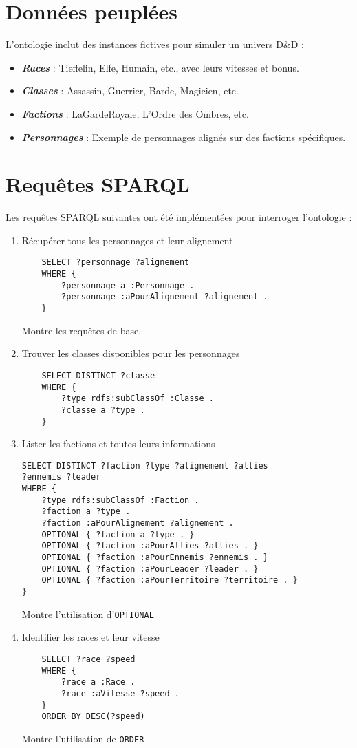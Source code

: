 \documentclass{article}
\newcommand{\cmd}[1]{\texttt{#1}}
\newcommand{\ib}[1]{\textit{\textbf{#1}}}
\begin{document}
\section{Données peuplées}

L'ontologie inclut des instances fictives pour simuler un univers D\&D :

\begin{itemize}
	\item \ib{Races} : Tieffelin, Elfe, Humain, etc., avec leurs vitesses et bonus.
	\item \ib{Classes} : Assassin, Guerrier, Barde, Magicien, etc.
	\item \ib{Factions} : LaGardeRoyale, L'Ordre des Ombres, etc.
	\item \ib{Personnages} : Exemple de personnages alignés sur des factions spécifiques.
\end{itemize}

\section{Requêtes SPARQL}

Les requêtes SPARQL suivantes ont été implémentées pour interroger l'ontologie :

\begin{enumerate}
	\item Récupérer tous les personnages et leur alignement
	\begin{lstlisting}
	SELECT ?personnage ?alignement
	WHERE {
		?personnage a :Personnage .
		?personnage :aPourAlignement ?alignement .
	}
	\end{lstlisting}
Montre les requêtes de base.
	\item Trouver les classes disponibles pour les personnages
	\begin{lstlisting}
	SELECT DISTINCT ?classe
	WHERE {
		?type rdfs:subClassOf :Classe .
		?classe a ?type .
	}
	\end{lstlisting}
\newpage
	\item Lister les factions et toutes leurs informations
	\begin{lstlisting}
SELECT DISTINCT ?faction ?type ?alignement ?allies
?ennemis ?leader
WHERE {
	?type rdfs:subClassOf :Faction .
	?faction a ?type .
	?faction :aPourAlignement ?alignement .
	OPTIONAL { ?faction a ?type . }
	OPTIONAL { ?faction :aPourAllies ?allies . }
	OPTIONAL { ?faction :aPourEnnemis ?ennemis . }
	OPTIONAL { ?faction :aPourLeader ?leader . }
	OPTIONAL { ?faction :aPourTerritoire ?territoire . }
}
	\end{lstlisting}
Montre l'utilisation d'\cmd{OPTIONAL}
	\item Identifier les races et leur vitesse
	\begin{lstlisting}
	SELECT ?race ?speed
	WHERE {
		?race a :Race .
		?race :aVitesse ?speed .
	}
	ORDER BY DESC(?speed)
	\end{lstlisting}
Montre l'utilisation de \cmd{ORDER}
\end{enumerate}
\end{document}

